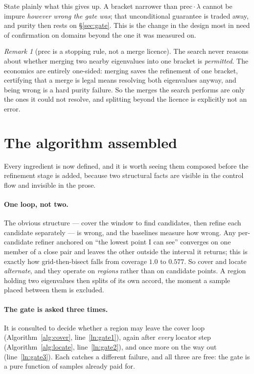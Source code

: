 \documentclass[11pt]{article}
\theoremstyle{definition}
\theoremstyle{remark}
\newtheorem{remark}{Remark}
\newcommand{\lam}{\lambda}
\newcommand{\pr}{\mathrm{prec}}
\begin{document}
State plainly what this gives up. A bracket narrower than $\pr\cdot\lam$ cannot be impure
\emph{however wrong the gate was}; that unconditional guarantee is traded away, and purity then
rests on \S\ref{sec:gate}. This is the change in the design most in need of confirmation on
domains beyond the one it was measured on.

\begin{remark}[$\pr$ is a stopping rule, not a merge licence]
The search never reasons about whether merging two nearby eigenvalues into one bracket is
\emph{permitted}. The economics are entirely one-sided: merging saves the refinement of one
bracket, certifying that a merge is legal means resolving both eigenvalues anyway, and being
wrong is a hard purity failure. So the merges the search performs are only the ones it could
not resolve, and splitting beyond the licence is explicitly not an error.
\end{remark}

\section{The algorithm assembled}
\label{sec:assembled}

Every ingredient is now defined, and it is worth seeing them composed before the refinement
stage is added, because two structural facts are visible in the control flow and invisible in
the prose.

\paragraph{One loop, not two.} The obvious structure --- cover the window to find candidates,
then refine each candidate separately --- is wrong, and the baselines measure how wrong. Any
per-candidate refiner anchored on ``the lowest point I can see'' converges on one member of a
close pair and leaves the other outside the interval it returns; this is exactly how
grid-then-bisect falls from coverage $1.0$ to $0.577$. So cover and locate \emph{alternate},
and they operate on \emph{regions} rather than on candidate points. A region holding two
eigenvalues then splits of its own accord, the moment a sample placed between them is excluded.

\paragraph{The gate is asked three times.} It is consulted to decide whether a region may leave
the cover loop (Algorithm~\ref{alg:cover}, line~\ref{ln:gate1}), again after \emph{every}
locator step (Algorithm~\ref{alg:locate}, line~\ref{ln:gate2}), and once more on the way out
(line~\ref{ln:gate3}). Each catches a different failure, and all three are free: the gate is a
pure function of samples already paid for.
\end{document}
